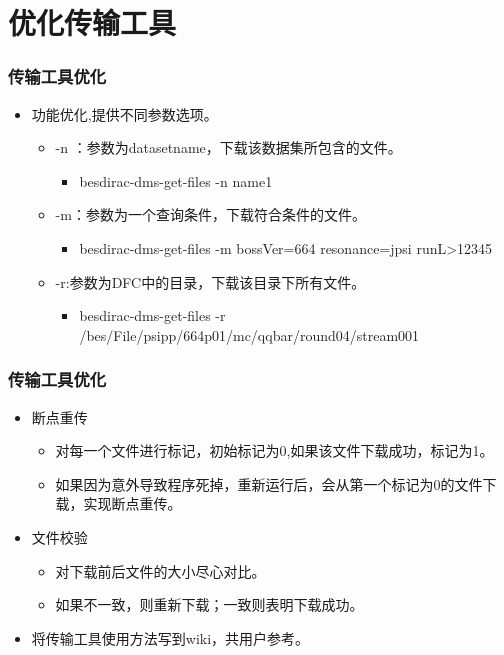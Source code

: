\documentclass{beamer}
\begin{document}
\section{优化传输工具}
\begin{frame}
  \frametitle{传输工具优化}
  \begin{itemize}
    \item 功能优化,提供不同参数选项。 
      \begin{itemize}
        \item -n ：参数为datasetname，下载该数据集所包含的文件。 
          \begin{itemize}
            \item besdirac-dms-get-files -n name1 
          \end{itemize}
        \item -m：参数为一个查询条件，下载符合条件的文件。
          \begin{itemize}
            \item besdirac-dms-get-files -m bossVer=664 resonance=jpsi runL>12345 
          \end{itemize}
        \item -r:参数为DFC中的目录，下载该目录下所有文件。
          \begin{itemize}
            \item besdirac-dms-get-files -r /bes/File/psipp/664p01/mc/qqbar/round04/stream001 
          \end{itemize}
      \end{itemize}
  \end{itemize}
\end{frame}
\begin{frame}
  \frametitle{传输工具优化}
  \begin{itemize}
    \item 断点重传 
      \begin{itemize}
        \item 对每一个文件进行标记，初始标记为0,如果该文件下载成功，标记为1。 
        \item 如果因为意外导致程序死掉，重新运行后，会从第一个标记为0的文件下载，实现断点重传。
      \end{itemize}
    \item 文件校验 
      \begin{itemize}
        \item 对下载前后文件的大小尽心对比。
        \item 如果不一致，则重新下载；一致则表明下载成功。 
      \end{itemize}
    \item 将传输工具使用方法写到wiki，共用户参考。
  \end{itemize}
\end{frame}
\end{document}
